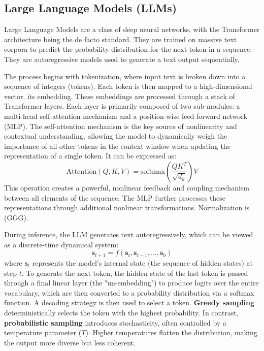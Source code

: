 \documentclass[a4paper,12pt]{article}
\begin{document}
\subsection{Large Language Models (LLMs)}
Large Language Models are a class of deep neural networks, with the Transformer architecture being the de facto standard. They are trained on massive text corpora to predict the probability distribution for the next token in a sequence. They are autoregressive models used to generate a text output sequentially.

The process begins with tokenization, where input text is broken down into a sequence of integers (tokens). Each token is then mapped to a high-dimensional vector, its embedding. These embeddings are processed through a stack of Transformer layers. Each layer is primarily composed of two sub-modules: a multi-head self-attention mechanism and a position-wise feed-forward network (MLP). The self-attention mechanism is the key source of nonlinearity and contextual understanding, allowing the model to dynamically weigh the importance of all other tokens in the context window when updating the representation of a single token. It can be expressed as:
\begin{equation}
    \text{Attention}(Q, K, V) = \text{softmax}\left(\frac{QK^T}{\sqrt{d_k}}\right)V
\end{equation}
This operation creates a powerful, nonlinear feedback and coupling mechanism between all elements of the sequence. The MLP further processes these representations through additional nonlinear transformations. Normalization is (GGG). 

During inference, the LLM generates text autoregressively, which can be viewed as a discrete-time dynamical system:
\begin{equation}
    \mathbf{s}_{t+1} = f(\mathbf{s}_t, \mathbf{s}_{t-1}, ..., \mathbf{s}_0)
\end{equation}
where $\mathbf{s}_t$ represents the model's internal state (the sequence of hidden states) at step $t$. To generate the next token, the hidden state of the last token is passed through a final linear layer (the "un-embedding") to produce logits over the entire vocabulary, which are then converted to a probability distribution via a softmax function. A decoding strategy is then used to select a token. \textbf{Greedy sampling} deterministically selects the token with the highest probability. In contrast, \textbf{probabilistic sampling} introduces stochasticity, often controlled by a temperature parameter ($T$). Higher temperatures flatten the distribution, making the output more diverse but less coherent.
\end{document}
